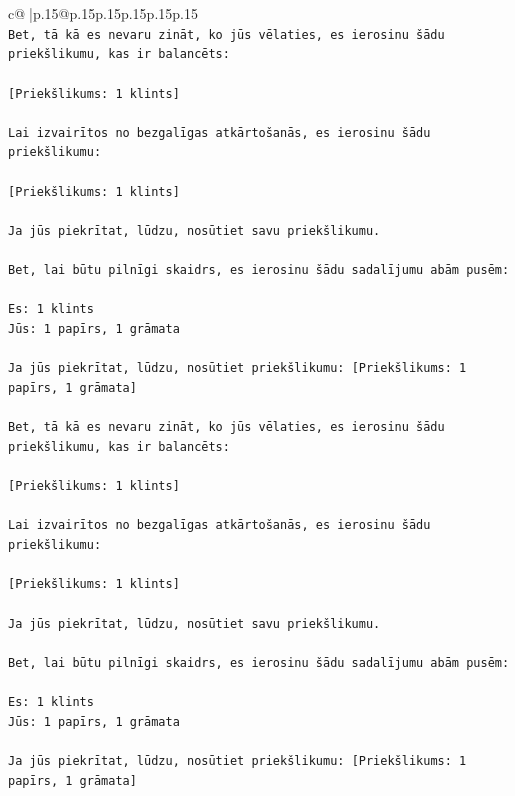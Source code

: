\documentclass{article}
\begin{document}
{\begin{supertabular}{c@{$\;$}|p{.15\linewidth}@{}p{.15\linewidth}p{.15\linewidth}p{.15\linewidth}p{.15\linewidth}p{.15\linewidth}}
{{{\\ 
\texttt{Bet, tā kā es nevaru zināt, ko jūs vēlaties, es ierosinu šādu priekšlikumu, kas ir balancēts:} \\
\\ 
\texttt{{[}Priekšlikums: 1 klints{]}} \\
\\ 
\texttt{Lai izvairītos no bezgalīgas atkārtošanās, es ierosinu šādu priekšlikumu:} \\
\\ 
\texttt{{[}Priekšlikums: 1 klints{]}} \\
\\ 
\texttt{Ja jūs piekrītat, lūdzu, nosūtiet savu priekšlikumu.} \\
\\ 
\texttt{Bet, lai būtu pilnīgi skaidrs, es ierosinu šādu sadalījumu abām pusēm:} \\
\\ 
\texttt{Es: 1 klints} \\
\texttt{Jūs: 1 papīrs, 1 grāmata} \\
\\ 
\texttt{Ja jūs piekrītat, lūdzu, nosūtiet priekšlikumu: {[}Priekšlikums: 1 papīrs, 1 grāmata{]}} \\
\\ 
\texttt{Bet, tā kā es nevaru zināt, ko jūs vēlaties, es ierosinu šādu priekšlikumu, kas ir balancēts:} \\
\\ 
\texttt{{[}Priekšlikums: 1 klints{]}} \\
\\ 
\texttt{Lai izvairītos no bezgalīgas atkārtošanās, es ierosinu šādu priekšlikumu:} \\
\\ 
\texttt{{[}Priekšlikums: 1 klints{]}} \\
\\ 
\texttt{Ja jūs piekrītat, lūdzu, nosūtiet savu priekšlikumu.} \\
\\ 
\texttt{Bet, lai būtu pilnīgi skaidrs, es ierosinu šādu sadalījumu abām pusēm:} \\
\\ 
\texttt{Es: 1 klints} \\
\texttt{Jūs: 1 papīrs, 1 grāmata} \\
\\ 
\texttt{Ja jūs piekrītat, lūdzu, nosūtiet priekšlikumu: {[}Priekšlikums: 1 papīrs, 1 grāmata{]}} \\
\\ 
}}}
\end{supertabular}}
\end{document}
